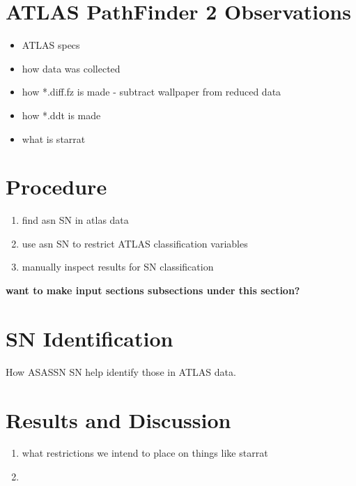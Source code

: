 \documentclass[aps,prb,twocolumn,superscriptaddress]{revtex4-1}
\begin{document}
\section{ATLAS PathFinder 2 Observations}
\begin{itemize}
	\item{} ATLAS specs
	\item{} how data was collected
	\item{} how *.diff.fz is made - subtract wallpaper from reduced data
	\item{} how *.ddt is made
	\item{} what is starrat
\end{itemize}



\section{Procedure}
\begin{enumerate}
	\item{} find asn SN in atlas data
	\item{} use asn SN to restrict ATLAS classification variables
	\item{} manually inspect results for SN classification
\end{enumerate}
{\bf want to make input sections subsections under this section?}





\section{SN Identification}
How ASASSN SN help identify those in ATLAS data.




\section{Results and Discussion}
\begin{enumerate}
	\item{} what restrictions we intend to place on things like starrat
	\item{} 
\end{enumerate}

\newpage\newpage
\end{document}
